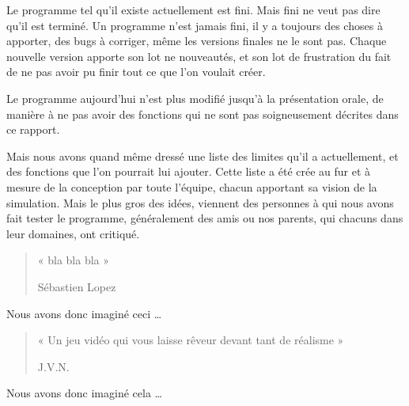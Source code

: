 Le programme tel qu'il existe actuellement est fini. Mais fini ne veut pas dire qu'il est terminé.
Un programme n'est jamais fini, il y a toujours des choses à apporter, des bugs à corriger, même les versions finales ne le sont pas. Chaque nouvelle version apporte son lot ne nouveautés, et son lot de frustration du fait de ne pas avoir pu finir tout ce que l'on voulait créer.

Le programme aujourd'hui n'est plus modifié jusqu'à la présentation orale, de manière à ne pas avoir des fonctions qui ne sont pas soigneusement décrites dans ce rapport.

Mais nous avons quand même dressé une liste des limites qu'il a actuellement, et des fonctions que l'on pourrait lui ajouter. Cette liste a été crée au fur et à mesure de la conception par toute l'équipe, chacun apportant sa vision de la simulation. Mais le plus gros des idées, viennent des personnes à qui nous avons fait tester le programme, généralement des amis ou nos parents, qui chacuns dans leur domaines, ont critiqué.

\begin{quotation}
	« bla bla bla »
	\begin{flushright}
		Sébastien Lopez
	\end{flushright}
\end{quotation}

Nous avons donc imaginé ceci …

\begin{quotation}
	« Un jeu vidéo qui vous laisse rêveur devant tant de réalisme »
	\begin{flushright}
		J.V.N.
	\end{flushright}
\end{quotation}


Nous avons donc imaginé cela …

